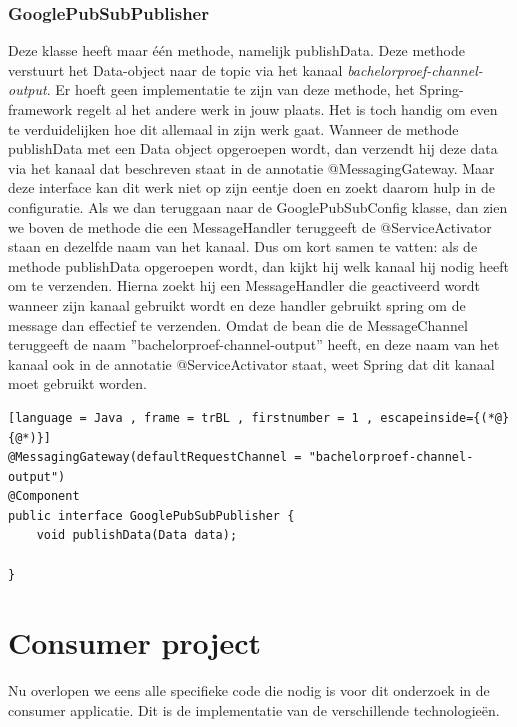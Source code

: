 \subsubsection{GooglePubSubPublisher}
Deze klasse heeft maar één methode, namelijk publishData. Deze methode verstuurt het Data-object naar de topic via het kanaal \emph{bachelorproef-channel-output}. Er hoeft geen implementatie te zijn van deze methode, het Spring-framework regelt al het andere werk in jouw plaats. Het is toch handig om even te verduidelijken hoe dit allemaal in zijn werk gaat. Wanneer de methode publishData met een Data object opgeroepen wordt, dan verzendt hij deze data via het kanaal dat beschreven staat in de annotatie @MessagingGateway. Maar deze interface kan dit werk niet op zijn eentje doen en zoekt daarom hulp in de configuratie. Als we dan teruggaan naar de GooglePubSubConfig klasse, dan zien we boven de methode die een MessageHandler teruggeeft de @ServiceActivator staan en dezelfde naam van het kanaal. Dus om kort samen te vatten: als de methode publishData opgeroepen wordt, dan kijkt hij welk kanaal hij nodig heeft om te verzenden. Hierna zoekt hij een MessageHandler die geactiveerd wordt wanneer zijn kanaal gebruikt wordt en deze handler gebruikt spring om de message dan effectief te verzenden. Omdat de bean die de MessageChannel teruggeeft de naam ''bachelorproef-channel-output'' heeft, en deze naam van het kanaal ook in de annotatie @ServiceActivator staat, weet Spring dat dit kanaal moet gebruikt worden.

\begin{lstlisting}[language = Java , frame = trBL , firstnumber = 1 , escapeinside={(*@}{@*)}]
@MessagingGateway(defaultRequestChannel = "bachelorproef-channel-output")
@Component
public interface GooglePubSubPublisher {
    void publishData(Data data);

}
\end{lstlisting}


\section{Consumer project}
Nu overlopen we eens alle specifieke code die nodig is voor dit onderzoek in de consumer applicatie. Dit is de implementatie van de verschillende technologieën.

